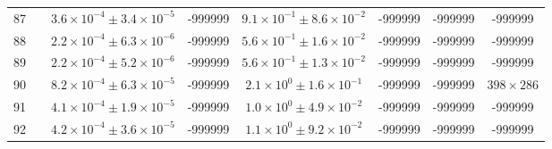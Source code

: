 \begin{table}
\begin{tabular}{cccccccc}
87 &  & $3.6\times10^{-4}\pm 3.4\times10^{-5}$ & -999999 & $9.1\times10^{-1}\pm 8.6\times10^{-2}$ & -999999 & -999999 & -999999 \\
88 &  & $2.2\times10^{-4}\pm 6.3\times10^{-6}$ & -999999 & $5.6\times10^{-1}\pm 1.6\times10^{-2}$ & -999999 & -999999 & -999999 \\
89 &  & $2.2\times10^{-4}\pm 5.2\times10^{-6}$ & -999999 & $5.6\times10^{-1}\pm 1.3\times10^{-2}$ & -999999 & -999999 & -999999 \\
90 &  & $8.2\times10^{-4}\pm 6.3\times10^{-5}$ & -999999 & $2.1\times10^{0}\pm 1.6\times10^{-1}$ & -999999 & -999999 & $398\times 286$ \\
91 &  & $4.1\times10^{-4}\pm 1.9\times10^{-5}$ & -999999 & $1.0\times10^{0}\pm 4.9\times10^{-2}$ & -999999 & -999999 & -999999 \\
92 &  & $4.2\times10^{-4}\pm 3.6\times10^{-5}$ & -999999 & $1.1\times10^{0}\pm 9.2\times10^{-2}$ & -999999 & -999999 & -999999 \\
\end{tabular}
\end{table}
